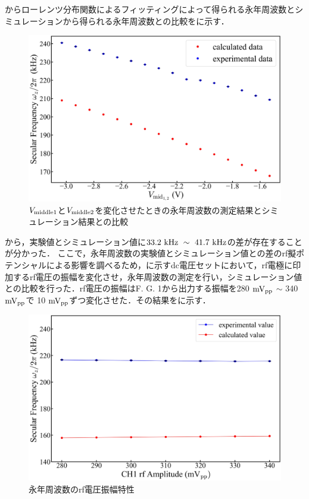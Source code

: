 からローレンツ分布関数によるフィッティングによって得られる永年周波数とシミュレーションから得られる永年周波数との比較をに示す．

\begin{figure}[h]
	\begin{center}
		\includegraphics[width = 0.6\linewidth]{./results/figure/Vmid-SecFreqZ.jpg}
		\caption{$V_{\rm middle1}$と$V_{\rm middle2}$を変化させたときの永年周波数の測定結果とシミュレーション結果との比較}
		\label{fig:mid12_MeasSec_SimSec}
	\end{center}
\end{figure}

から，実験値とシミュレーション値に$33.2 \ {\rm kHz} \ \sim \ 41.7 \ {\rm kHz}$の差が存在することが分かった．
%
\clearpage
%
ここで，永年周波数の実験値とシミュレーション値との差のrf擬ポテンシャルによる影響を調べるため，に示すdc電圧セットにおいて，rf電極に印加するrf電圧の振幅を変化させ，永年周波数の測定を行い，シミュレーション値との比較を行った．rf電圧の振幅はF. G. 1から出力する振幅を280 ${\rm mV_{pp}}$ $\sim$ 340 ${\rm mV_{pp}}$で 10 ${\rm mV_{pp}}$ずつ変化させた．その結果をに示す．

\begin{figure}[h]
	\begin{center}
		\includegraphics[width = 0.6\linewidth]{./results/figure/rf_SecFreq.jpg}
		\caption{永年周波数のrf電圧振幅特性}
		\label{fig:rf_SecFreq}
	\end{center}
\end{figure}

